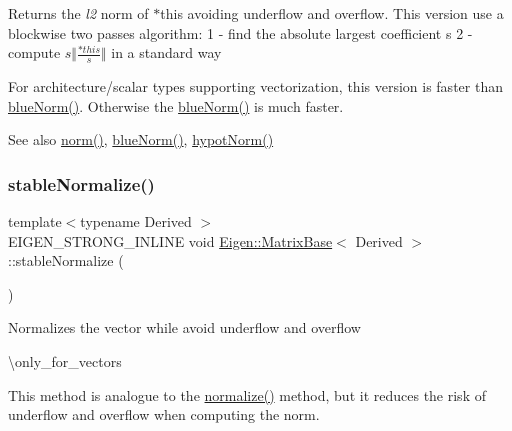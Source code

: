 \begin{DoxyReturn}{Returns}
the {\itshape l2} norm of {\ttfamily $\ast$this} avoiding underflow and overflow. This version use a blockwise two passes algorithm\+: 1 -\/ find the absolute largest coefficient {\ttfamily s} 2 -\/ compute $ s \Vert \frac{*this}{s} \Vert $ in a standard way
\end{DoxyReturn}
For architecture/scalar types supporting vectorization, this version is faster than \mbox{\hyperlink{class_eigen_1_1_matrix_base_a3f3faa00163c16824ff03e58a210c74c}{blue\+Norm()}}. Otherwise the \mbox{\hyperlink{class_eigen_1_1_matrix_base_a3f3faa00163c16824ff03e58a210c74c}{blue\+Norm()}} is much faster.

\begin{DoxySeeAlso}{See also}
\mbox{\hyperlink{class_eigen_1_1_matrix_base_a5f6a3bc46add1f2e879ce15040e6987e}{norm()}}, \mbox{\hyperlink{class_eigen_1_1_matrix_base_a3f3faa00163c16824ff03e58a210c74c}{blue\+Norm()}}, \mbox{\hyperlink{class_eigen_1_1_matrix_base_a32222d3b6677e6cdf0b801463f329b72}{hypot\+Norm()}} 
\end{DoxySeeAlso}
\mbox{\label{class_eigen_1_1_matrix_base_aaf1f5a729324eecc1399591ce9324e9a}} 
\subsubsection{\texorpdfstring{stableNormalize()}{stableNormalize()}}
{\footnotesize\ttfamily template$<$typename Derived $>$ \\
E\+I\+G\+E\+N\+\_\+\+S\+T\+R\+O\+N\+G\+\_\+\+I\+N\+L\+I\+NE void \mbox{\hyperlink{class_eigen_1_1_matrix_base}{Eigen\+::\+Matrix\+Base}}$<$ Derived $>$\+::stable\+Normalize (\begin{DoxyParamCaption}{ }\end{DoxyParamCaption})}

Normalizes the vector while avoid underflow and overflow

\textbackslash{}only\+\_\+for\+\_\+vectors

This method is analogue to the \mbox{\hyperlink{class_eigen_1_1_matrix_base_a1a2dd2fd1597ee6d51098aa3bb7c86f4}{normalize()}} method, but it reduces the risk of underflow and overflow when computing the norm.

